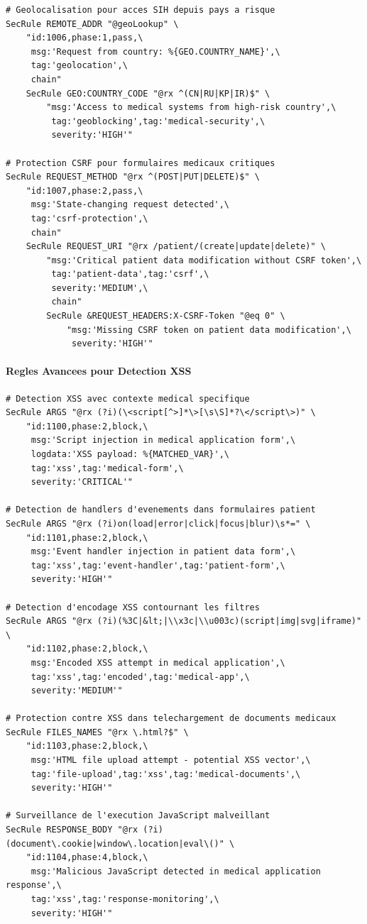 \begin{lstlisting}[caption=Configuration ModSecurity pour applications medicales]
# Geolocalisation pour acces SIH depuis pays a risque
SecRule REMOTE_ADDR "@geoLookup" \
    "id:1006,phase:1,pass,\
     msg:'Request from country: %{GEO.COUNTRY_NAME}',\
     tag:'geolocation',\
     chain"
    SecRule GEO:COUNTRY_CODE "@rx ^(CN|RU|KP|IR)$" \
        "msg:'Access to medical systems from high-risk country',\
         tag:'geoblocking',tag:'medical-security',\
         severity:'HIGH'"

# Protection CSRF pour formulaires medicaux critiques
SecRule REQUEST_METHOD "@rx ^(POST|PUT|DELETE)$" \
    "id:1007,phase:2,pass,\
     msg:'State-changing request detected',\
     tag:'csrf-protection',\
     chain"
    SecRule REQUEST_URI "@rx /patient/(create|update|delete)" \
        "msg:'Critical patient data modification without CSRF token',\
         tag:'patient-data',tag:'csrf',\
         severity:'MEDIUM',\
         chain"
        SecRule &REQUEST_HEADERS:X-CSRF-Token "@eq 0" \
            "msg:'Missing CSRF token on patient data modification',\
             severity:'HIGH'"
\end{lstlisting}

\paragraph{Regles Avancees pour Detection XSS}

\begin{lstlisting}[caption=Regles XSS specialisees pour environnement medical]
# Detection XSS avec contexte medical specifique
SecRule ARGS "@rx (?i)(\<script[^>]*\>[\s\S]*?\</script\>)" \
    "id:1100,phase:2,block,\
     msg:'Script injection in medical application form',\
     logdata:'XSS payload: %{MATCHED_VAR}',\
     tag:'xss',tag:'medical-form',\
     severity:'CRITICAL'"

# Detection de handlers d'evenements dans formulaires patient
SecRule ARGS "@rx (?i)on(load|error|click|focus|blur)\s*=" \
    "id:1101,phase:2,block,\
     msg:'Event handler injection in patient data form',\
     tag:'xss',tag:'event-handler',tag:'patient-form',\
     severity:'HIGH'"

# Detection d'encodage XSS contournant les filtres
SecRule ARGS "@rx (?i)(%3C|&lt;|\\x3c|\\u003c)(script|img|svg|iframe)" \
    "id:1102,phase:2,block,\
     msg:'Encoded XSS attempt in medical application',\
     tag:'xss',tag:'encoded',tag:'medical-app',\
     severity:'MEDIUM'"

# Protection contre XSS dans telechargement de documents medicaux
SecRule FILES_NAMES "@rx \.html?$" \
    "id:1103,phase:2,block,\
     msg:'HTML file upload attempt - potential XSS vector',\
     tag:'file-upload',tag:'xss',tag:'medical-documents',\
     severity:'HIGH'"

# Surveillance de l'execution JavaScript malveillant
SecRule RESPONSE_BODY "@rx (?i)(document\.cookie|window\.location|eval\()" \
    "id:1104,phase:4,block,\
     msg:'Malicious JavaScript detected in medical application response',\
     tag:'xss',tag:'response-monitoring',\
     severity:'HIGH'"
\end{lstlisting}

